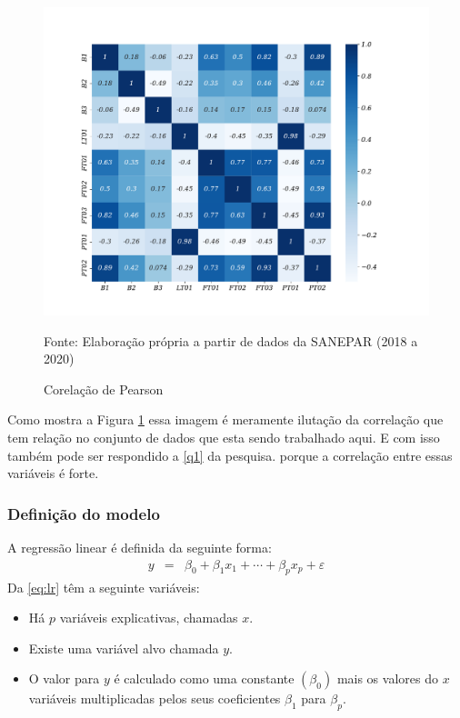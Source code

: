 \begin{figure}[H]
	\centering
	\caption{Corelação de Pearson}
	\label{fig:person}
	\includegraphics[width=0.7\linewidth]{Apendices/Figuras/modelagem-24h/person}
	
	Fonte: Elaboração própria a partir de dados da SANEPAR (2018 a 2020)
\end{figure}

Como mostra a Figura \ref{fig:person} essa imagem é meramente ilutação da correlação que tem relação no conjunto de dados que esta sendo trabalhado aqui. E com isso também pode ser respondido a \ref{q1} da pesquisa. porque a correlação entre essas variáveis é forte.

\subsubsection{Defini\c c\~ ao do modelo}

A regressão linear é definida da seguinte forma:
\begin{eqnarray}
	y&=&\beta_0+\beta_1 x_1+\cdots+\beta_p x_p+\varepsilon\label{eq:lr}
\end{eqnarray}
Da \eqref{eq:lr} têm a seguinte variáveis:

\begin{itemize}
	\item  Há $p$ variáveis explicativas, chamadas $x$.
	\item Existe uma variável alvo chamada $y$.
	\item  O valor para $y$ é calculado como uma constante $\left(\beta_0\right)$ mais os valores do $x$ variáveis multiplicadas pelos seus coeficientes $\beta_1$ para $\beta_p$.
\end{itemize}

